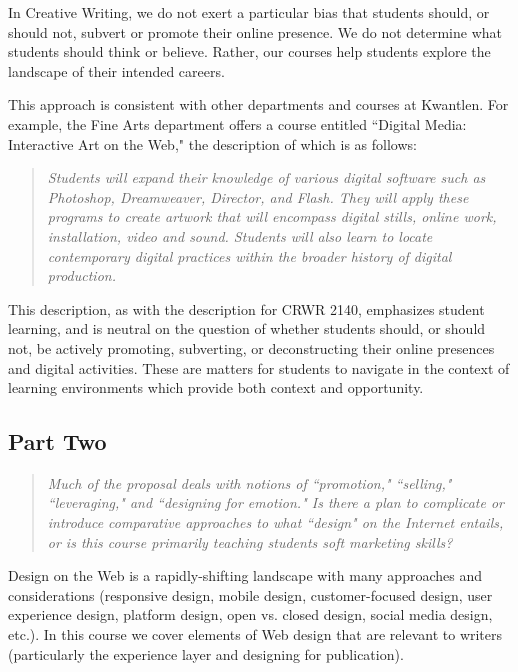 \documentclass[letterpaper,10pt,headsepline]{scrreprt}
\begin{document}
In Creative Writing, we do not exert a particular bias that students should, or should not, subvert or promote their online presence. We do not determine what students should think or believe. Rather, our courses help students explore the landscape of their intended careers.

This approach is consistent with other departments and courses at Kwantlen. For example, the Fine Arts department offers a course entitled ``Digital Media: Interactive Art on the Web," the description of which is as follows:

\begin{quote}
\textit{Students will expand their knowledge of various digital software such as Photoshop, Dreamweaver, Director, and Flash. They will apply these programs to create artwork that will encompass digital stills, online work, installation, video and sound. Students will also learn to locate contemporary digital practices within the broader history of digital production.}
\end{quote}

This description, as with the description for CRWR 2140, emphasizes student learning, and is neutral on the question of whether students should, or should not, be actively promoting, subverting, or deconstructing their online presences and digital activities. These are matters for students to navigate in the context of learning environments which provide both context and opportunity.

\subsection{Part Two}

\begin{quote}
\textit{Much of the proposal deals with notions of ``promotion," ``selling," ``leveraging," and ``designing for emotion." Is there a plan to complicate or introduce comparative approaches to what ``design" on the Internet entails, or is this course primarily teaching students soft marketing skills?}
\end{quote}

Design on the Web is a rapidly-shifting landscape with many approaches and considerations (responsive design, mobile design, customer-focused design, user experience design, platform design, open vs. closed design, social media design, etc.). In this course we cover elements of Web design that are relevant to writers (particularly the experience layer and designing for publication).
\end{document}
